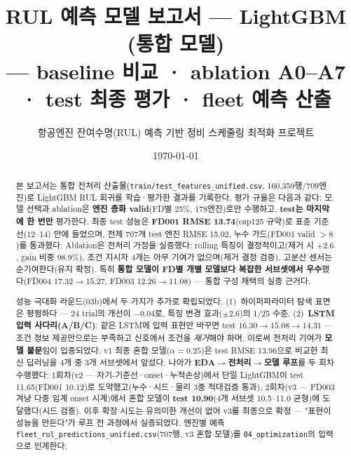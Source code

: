 \documentclass[11pt]{article}
\title{\textbf{RUL 예측 모델 보고서 — LightGBM (통합 모델)}\\[3pt]
\large — baseline 비교 · ablation A0--A7 · test 최종 평가 · fleet 예측 산출}
\author{항공엔진 잔여수명(RUL) 예측 기반 정비 스케줄링 최적화 프로젝트}
\date{\today}
\begin{document}
\maketitle

\begin{abstract}
\noindent
본 보고서는 통합 전처리 산출물(\texttt{train/test\_features\_unified.csv}, 160{,}359행/709엔진)로
LightGBM RUL 회귀를 학습·평가한 결과를 기록한다.
평가 규율은 다음과 같다: 모델 선택과 ablation은 \textbf{엔진 층화 valid}(FD별 25\%, 178엔진)로만 수행하고, \textbf{test는 마지막에 한 번만} 평가한다.
최종 test 성능은 \textbf{FD001 RMSE 13.74}(cap125 규약)로 표준 기준선(12--14) 안에 들었으며,
전체 707개 test 엔진 RMSE 15.02, 누수 가드(FD001 valid $>8$)를 통과했다.
Ablation은 전처리 가정을 실증했다:
rolling 특징이 결정적이고(제거 시 $+2.6$, gain 비중 98.9\%),
조건 지시자 4개는 아무 기여가 없으며(제거 결정 검증),
고분산 센서는 순기여한다(유지 확정).
특히 \textbf{통합 모델이 FD별 개별 모델보다 복잡한 서브셋에서 우수}했다(FD004 $17.32 \to 15.27$, FD003 $12.26 \to 11.08$) — 통합 구성 채택의 실증 근거다.

성능 극대화 라운드(03b)에서 두 가지가 추가로 확립되었다.
(1)~하이퍼파라미터 탐색 표면은 평평하다 — 24 trial의 개선이 $-0.04$로, 특징 변경 효과($\pm2.6$)의 1/25 수준.
(2)~\textbf{LSTM 입력 사다리(A/B/C)}: 같은 LSTM에 입력 표현만 바꾸면 test $16.30 \to 15.08 \to 14.31$ —
조건 정보 제공만으로는 부족하고 신호에서 조건을 \emph{제거}해야 하며, 이로써 전처리 기여가 \textbf{모델 불문}임이 입증되었다.
v1 최종 혼합 모델($\alpha{=}0.25$)은 test RMSE 13.96으로 비교한 최신 딥러닝을 4개 중 3개 서브셋에서 앞섰다.
나아가 \textbf{EDA$\to$전처리$\to$모델 루프}를 두 회차 수행했다:
1회차(v2 — 자기-기준선·onset·누적손상)에서 단일 LightGBM이 test 11.65(FD001 10.12)로 도약했고(누수·시드·물리 3중 적대검증 통과),
2회차(v3 — FD003 겨냥 다중 임계 onset 시계)에서 혼합 모델이 \textbf{test 10.90}(4개 서브셋 10.5--11.0 균형)에 도달했다(시드 검증).
이후 확장 시도는 유의미한 개선이 없어 v3를 최종으로 확정 — "표현이 성능을 만든다"가 루프 전 과정에서 실증되었다.
엔진별 예측 \texttt{fleet\_rul\_predictions\_unified.csv}(707행, v3 혼합 모델)를 \texttt{04\_optimization}의 입력으로 인계한다.
\end{abstract}
\vspace{0.5em}
\begin{center}\end{center}
\vspace{0.5em}
\end{document}
